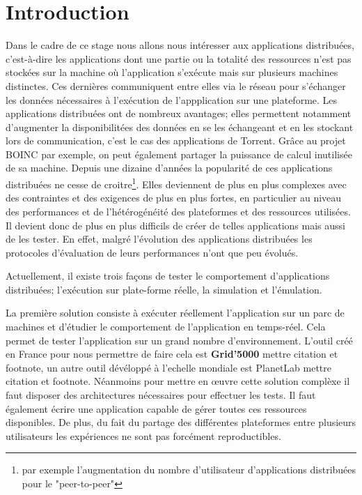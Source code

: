 \section{Introduction}



Dans le cadre de ce stage nous allons nous intéresser aux applications distribuées, c'est-à-dire les applications dont une partie ou la totalité des ressources  n'est pas stockées sur la machine où l'application s'exécute mais sur plusieurs machines distinctes. Ces dernières communiquent entre elles via le réseau pour s'échanger les données nécessaires à l'exécution de l'appplication sur une plateforme. Les applications distribuées ont de nombreux avantages; elles permettent notamment d'augmenter la disponibilitées des données en se les échangeant et en les stockant lors de communication, c'est le cas des applications de Torrent. Grâce au projet BOINC par exemple, on peut également partager la puissance de calcul inutilisée de sa machine. Depuis une dizaine d'années la popularité de ces applications distribuées ne cesse de croitre\footnote{par exemple l'augmentation du nombre d'utilisateur d'applications distribuées pour le "peer-to-peer"}. Elles deviennent de plus en plus complexes avec des contraintes et des exigences de plus en plus fortes, en particulier au niveau des performances et de l'hétérogénéité des plateformes et des ressources utilisées. Il devient donc de plus en plus difficils de créer de telles applications mais aussi de les tester. En effet, malgré l'évolution des applications distribuées les protocoles d'évaluation de leurs performances n'ont que peu évolués.

Actuellement, il existe trois façons de tester le comportement d'applications distribuées; l'exécution sur plate-forme réelle, la simulation et l'émulation. 

La première solution consiste à exécuter réellement l'application sur un parc de machines et d'étudier le comportement de l'application en temps-réel. Cela permet de tester l'application sur un grand nombre d'environnement. L'outil créé en France pour nous permettre de faire cela est \textbf{Grid'5000} {\color{red}mettre citation et footnote}, un autre outil dévéloppé à l'echelle mondiale est PlanetLab {\color{red}mettre citation et footnote}. Néanmoins pour mettre en \oe uvre cette solution complèxe il faut disposer des architectures nécessaires pour effectuer les tests. Il faut également écrire une application capable de gérer toutes ces ressources disponibles. De plus, du fait du partage des différentes plateformes entre plusieurs utilisateurs les expériences ne sont pas forcément reproductibles. 

